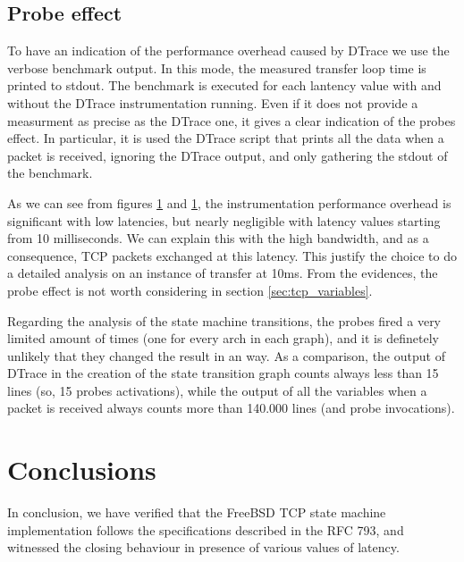 \documentclass[a4paper,10pt]{article}
\begin{document}
\subsection{Probe effect}

To have an indication of the performance overhead caused by DTrace we use the verbose benchmark output. In this mode, the measured transfer loop time is printed to stdout. The benchmark is executed for each lantency value with and without the DTrace instrumentation running. Even if it does not provide a measurment as precise as the DTrace one, it gives a clear indication of the probes effect.
In particular, it is used the DTrace script that prints all the data when a packet is received, ignoring the DTrace output, and only gathering the stdout of the benchmark.

As we can see from figures \ref{} and \ref{}, the instrumentation performance overhead is significant with low latencies, but nearly negligible with latency values starting from 10 milliseconds. We can explain this with the high bandwidth, and as a consequence, TCP packets exchanged at this latency. This justify the choice to do a detailed analysis on an instance of transfer at 10ms. From the evidences, the probe effect is not worth considering in section \ref{sec:tcp_variables}.

Regarding the analysis of the state machine transitions, the probes fired a very limited amount of times (one for every arch in each graph), and it is definetely unlikely that they changed the result in an way. As a comparison, the output of DTrace in the creation of the state transition graph counts always less than 15 lines (so, 15 probes activations), while the output of all the variables when a packet is received always counts more than 140.000 lines (and probe invocations).


\section{Conclusions}

In conclusion, we have verified that the FreeBSD TCP state machine implementation follows the specifications described in the RFC 793\cite{postel_transmission_nodate}, and witnessed the closing behaviour in presence of various values of latency.
\end{document}
